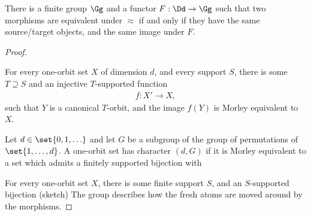 \begin{claim}\label{claim:equivalence-relation-finite-group}
        There is a finite group $\Gg$ and a functor $F : \Dd \to \Gg$
        such that two morphisms are equivalent under $\approx$ if and only if they have the same source/target objects, and the same image under $F$.
    \end{claim}
    \begin{proof}



        \begin{subclaim}
            For every one-orbit set $X$ of dimension $d$,  and every support $S$, there is some $T \supseteq S$ and an injective $T$-supported function 
            \begin{align*}
            f : X' \to X,
            \end{align*}
            such that $Y$ is a canonical $T$-orbit, and the image $f(Y)$ is  Morley equivalent to $X$. 
        \end{subclaim}

        \begin{definition}
            Let $d \in \set{0,1,\ldots}$ and let $G$ be a subgroup of the group of permutations of $\set{1,\ldots,d}$. 
            A one-orbit set has character $(d,G)$ if it is Morley equivalent to a set which admits a finitely supported bijection with 
        \end{definition}


        For every one-orbit set $X$, there is some finite support $S$, and an $S$-supported bijection 
        (sketch) The group describes how the fresh atoms are moved around by the morphisms.
    \end{proof}
